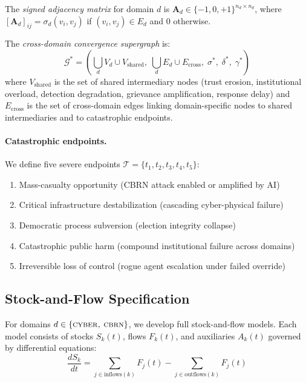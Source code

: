 \documentclass[11pt]{article}
\begin{document}
The \textit{signed adjacency matrix} for domain $d$ is $\mathbf{A}_d \in \{-1, 0, +1\}^{n_d \times n_d}$, where $[\mathbf{A}_d]_{ij} = \sigma_d(v_i, v_j)$ if $(v_i, v_j) \in E_d$ and $0$ otherwise.

The \textit{cross-domain convergence supergraph} is:
\begin{equation}
\mathcal{G}^* = \left(\bigcup_{d} V_d \cup V_{\text{shared}},\; \bigcup_{d} E_d \cup E_{\text{cross}},\; \sigma^*,\; \delta^*,\; \gamma^*\right)
\end{equation}
where $V_{\text{shared}}$ is the set of shared intermediary nodes (trust erosion, institutional overload, detection degradation, grievance amplification, response delay) and $E_{\text{cross}}$ is the set of cross-domain edges linking domain-specific nodes to shared intermediaries and to catastrophic endpoints.

\paragraph{Catastrophic endpoints.} We define five severe endpoints $\mathcal{T} = \{t_1, t_2, t_3, t_4, t_5\}$:
\begin{enumerate}[leftmargin=2em,itemsep=1pt]
\item[$t_1$:] Mass-casualty opportunity (CBRN attack enabled or amplified by AI)
\item[$t_2$:] Critical infrastructure destabilization (cascading cyber-physical failure)
\item[$t_3$:] Democratic process subversion (election integrity collapse)
\item[$t_4$:] Catastrophic public harm (compound institutional failure across domains)
\item[$t_5$:] Irreversible loss of control (rogue agent escalation under failed override)
\end{enumerate}

\subsection{Stock-and-Flow Specification}
\label{sec:stockflow}

For domains $d \in \{\textsc{cyber, cbrn}\}$, we develop full stock-and-flow models. Each model consists of stocks $S_k(t)$, flows $F_k(t)$, and auxiliaries $A_k(t)$ governed by differential equations:
\begin{equation}
\frac{dS_k}{dt} = \sum_{j \in \text{inflows}(k)} F_j(t) - \sum_{j \in \text{outflows}(k)} F_j(t)
\end{equation}
\end{document}
